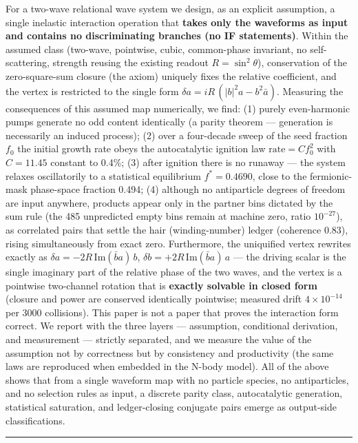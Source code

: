 \documentclass[
  a4paper,
]{article}
\begin{document}
For a two-wave relational wave system we design, as an explicit
assumption, a single inelastic interaction operation that \textbf{takes
only the waveforms as input and contains no discriminating branches (no
IF statements)}. Within the assumed class (two-wave, pointwise, cubic,
common-phase invariant, no self-scattering, strength reusing the
existing readout \(R=\sin^2\theta\)), conservation of the
zero-square-sum closure (the axiom) uniquely fixes the relative
coefficient, and the vertex is restricted to the single form
\(\delta a = i R\,(|b|^2 a - b^2 \bar a)\). Measuring the consequences
of this assumed map numerically, we find: (1) purely even-harmonic pumps
generate no odd content identically (a parity theorem --- generation is
necessarily an induced process); (2) over a four-decade sweep of the
seed fraction \(f_0\) the initial growth rate obeys the autocatalytic
ignition law \(\mathrm{rate}=C f_0^2\) with \(C=11.45\) constant to
0.4\%; (3) after ignition there is no runaway --- the system relaxes
oscillatorily to a statistical equilibrium \(f^*=0.4690\), close to the
fermionic-mask phase-space fraction 0.494; (4) although no antiparticle
degrees of freedom are input anywhere, products appear only in the
partner bins dictated by the sum rule (the 485 unpredicted empty bins
remain at machine zero, ratio \(10^{-27}\)), as correlated pairs that
settle the hair (winding-number) ledger (coherence 0.83), rising
simultaneously from exact zero. Furthermore, the uniquified vertex
rewrites exactly as \(\delta a = -2R\,\mathrm{Im}(\bar b a)\,b\),
\(\delta b = +2R\,\mathrm{Im}(\bar b a)\,a\) --- the driving scalar is
the single imaginary part of the relative phase of the two waves, and
the vertex is a pointwise two-channel rotation that is \textbf{exactly
solvable in closed form} (closure and power are conserved identically
pointwise; measured drift \(4\times10^{-14}\) per 3000 collisions). This
paper is not a paper that proves the interaction form correct. We report
with the three layers --- assumption, conditional derivation, and
measurement --- strictly separated, and we measure the value of the
assumption not by correctness but by consistency and productivity (the
same laws are reproduced when embedded in the N-body model). All of the
above shows that from a single waveform map with no particle species, no
antiparticles, and no selection rules as input, a discrete parity class,
autocatalytic generation, statistical saturation, and ledger-closing
conjugate pairs emerge as output-side classifications.

\begin{center}\rule{0.5\linewidth}{0.5pt}\end{center}
\end{document}
